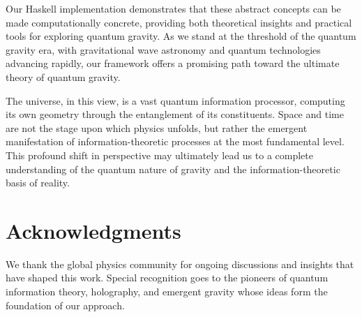 \documentclass[12pt,a4paper]{article}
\begin{document}
Our Haskell implementation demonstrates that these abstract concepts can be made computationally concrete, providing both theoretical insights and practical tools for exploring quantum gravity. As we stand at the threshold of the quantum gravity era, with gravitational wave astronomy and quantum technologies advancing rapidly, our framework offers a promising path toward the ultimate theory of quantum gravity.

The universe, in this view, is a vast quantum information processor, computing its own geometry through the entanglement of its constituents. Space and time are not the stage upon which physics unfolds, but rather the emergent manifestation of information-theoretic processes at the most fundamental level. This profound shift in perspective may ultimately lead us to a complete understanding of the quantum nature of gravity and the information-theoretic basis of reality.

\section*{Acknowledgments}

We thank the global physics community for ongoing discussions and insights that have shaped this work. Special recognition goes to the pioneers of quantum information theory, holography, and emergent gravity whose ideas form the foundation of our approach.
\end{document}
